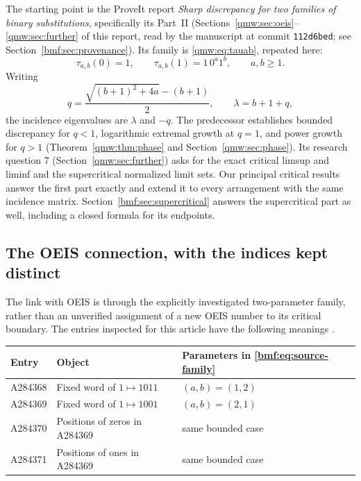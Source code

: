 \documentclass[11pt]{article}
\numberwithin{equation}{section}
\theoremstyle{definition}
\theoremstyle{remark}
\begin{document}
The starting point is the ProveIt report \emph{Sharp discrepancy for
two families of binary substitutions}, specifically its Part~II
(Sections~\ref{qmw:sec:oeis}--\ref{qmw:sec:further} of this report, read
by the manuscript at commit \texttt{112d6bed}; see
Section~\ref{bmf:sec:provenance}). Its family is
\eqref{qmw:eq:tauab}, repeated here:
\begin{equation}\label{bmf:eq:source-family}
 \tau_{a,b}(0)=1,\qquad \tau_{a,b}(1)=1\,0^a1^b,\qquad a,b\geq1.
\end{equation}
Writing
\begin{equation}\label{bmf:eq:source-spectrum}
 q=\frac{\sqrt{(b+1)^2+4a}-(b+1)}2,\qquad
 \lambda=b+1+q,
\end{equation}
the incidence eigenvalues are $\lambda$ and $-q$. The predecessor
establishes bounded discrepancy for $q<1$, logarithmic extremal growth
at $q=1$, and power growth for $q>1$ (Theorem~\ref{qmw:thm:phase} and
Section~\ref{qmw:sec:phase}). Its research question 7
(Section~\ref{qmw:sec:further}) asks for
the exact critical limsup and liminf and the supercritical normalized
limit sets. Our principal critical results answer the first part
exactly and extend it to every arrangement with the same incidence
matrix. Section~\ref{bmf:sec:supercritical} answers the supercritical
part as well, including a closed formula for its endpoints.

\subsection{The OEIS connection, with the indices kept distinct}

The link with OEIS is through the explicitly investigated
two-parameter family, rather than an unverified assignment of a new
OEIS number to its critical boundary. The entries inspected for this
article have the following meanings \cite{oeis368,oeis369,oeis370,oeis371}.

\begin{center}
\begin{tabular}{lll}
\toprule
Entry & Object & Parameters in \eqref{bmf:eq:source-family}\\
\midrule
A284368 & Fixed word of $1\mapsto1011$ & $(a,b)=(1,2)$\\
A284369 & Fixed word of $1\mapsto1001$ & $(a,b)=(2,1)$\\
A284370 & Positions of zeros in A284369 & same bounded case\\
A284371 & Positions of ones in A284369 & same bounded case\\
\bottomrule
\end{tabular}
\end{center}
\end{document}
